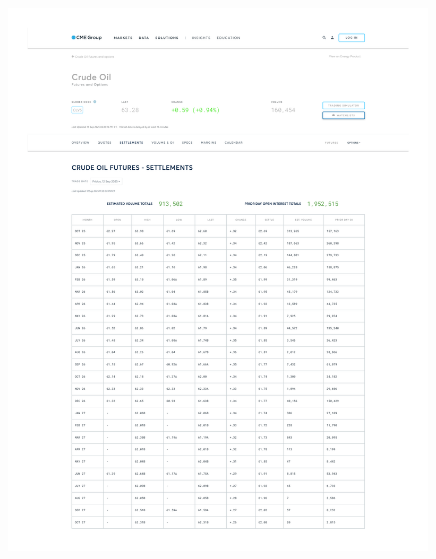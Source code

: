 \documentclass[11pt,a4paper]{article} %
\begin{document}
\begin{figure}[h]
  \centering
  \includegraphics[width=0.99\textwidth]{appendix/CRUDEOIL12SEP.pdf}
  \label{fig:crudeoil_settlements}
\end{figure}
\end{document}

